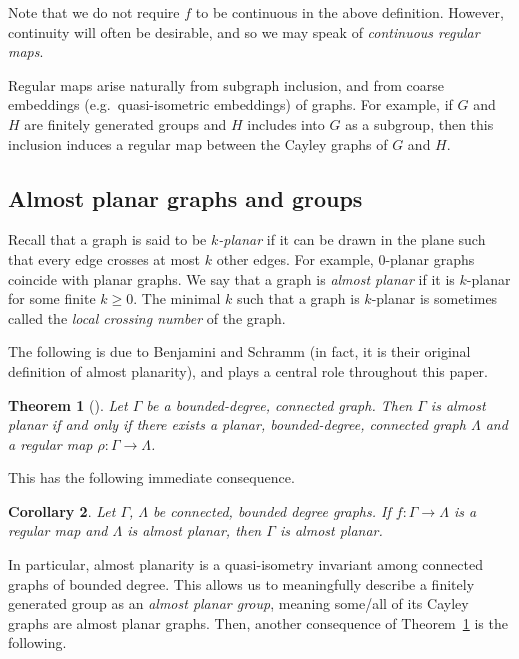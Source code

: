 \documentclass[11pt,a4paper]{amsart}
\newtheorem{theorem}{Theorem}[section]%
\newtheorem{corollary}[theorem]{Corollary}
\theoremstyle{definition}
\begin{document}
Note that we do not require $f$ to be continuous in the above definition. However, continuity will often be desirable, and so we may speak of \emph{continuous regular maps}. 

Regular maps arise naturally from subgraph inclusion, and from coarse embeddings (e.g.\ quasi-isometric embeddings) of graphs.  For example, if $G$ and $H$ are finitely generated groups and $H$ includes into $G$ as a subgroup, then this inclusion induces a regular map between the Cayley graphs of $G$ and $H$.



\subsection{Almost planar graphs and groups}\label{sec:prelims-almost-planar}


Recall that a graph is said to be \emph{$k$-planar} if it can be drawn in the plane such that every edge crosses at most $k$ other edges. For example, 0-planar graphs coincide with planar graphs. We say that a graph is \emph{almost planar} if it is $k$-planar for some finite $k \geq 0$. The minimal $k$ such that a graph is $k$-planar is sometimes called the \emph{local crossing number} of the graph.

The following is due to Benjamini and Schramm \cite{benjamini1996harmonic} (in fact, it is their original definition of almost planarity), and plays a central role throughout this paper. 


\begin{theorem}[{\cite[Thm.~1.8]{benjamini1996harmonic}}]\label{prop:almost-planar-regular-map-char}
    Let $\Gamma$ be a bounded-degree, connected graph. Then $\Gamma$ is almost planar if and only if there exists a planar, bounded-degree, connected graph $\Lambda$ and a regular map $\rho : \Gamma \to \Lambda$. 
\end{theorem}


This has the following immediate consequence. 

\begin{corollary}
    Let $\Gamma$, $\Lambda$ be connected, bounded degree graphs.
    If $f : \Gamma \to \Lambda$ is a regular map and $\Lambda$ is almost planar, then $\Gamma$ is almost planar.
\end{corollary}

In particular, almost planarity is a quasi-isometry invariant among connected graphs of bounded degree. This allows us to meaningfully describe a finitely generated group as an \emph{almost planar group}, meaning some/all of its Cayley graphs are almost planar graphs.
Then, another consequence of Theorem~\ref{prop:almost-planar-regular-map-char} is the following.
\end{document}
